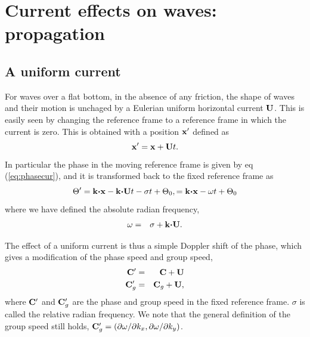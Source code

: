 \section{Current effects on waves: propagation}
\subsection{A uniform current}
For waves over a flat bottom, in the absence of any friction, the shape of waves and their 
motion is unchaged by a Eulerian uniform horizontal current $\mathbf{U}$. This is easily seen by changing 
the reference frame to a reference frame in which the current is zero. This is obtained with  a position $\mathbf{x}'$ defined as
\begin{equation}
\mathbf{x}' =\mathbf{x} + \mathbf{U} t.
\end{equation} 
In particular the phase in the moving reference frame is given by eq (\ref{eq:phasecur}), and it is transformed back to the fixed reference 
frame as 
\begin{equation}
 \Theta'={\mathbf
k}\mbox{\boldmath $\cdot$}{\mathbf x} - {\mathbf
k}\mbox{\boldmath $\cdot$} \mathbf{U} t -\sigma t+ \Theta_0,  =  {\mathbf
k}\mbox{\boldmath $\cdot$}{\mathbf x} - \omega  t+ \Theta_0\label{eq:phasecur}
\end{equation}
where we have defined the absolute radian frequency, 
\begin{eqnarray}
\omega &=& \sigma + \mathbf{k} \mbox{\boldmath $\cdot$} \mathbf{U}.
\end{eqnarray}

The effect of a uniform current is thus a simple Doppler shift of the phase, which gives a modification of the 
phase speed and group speed, 
\begin{eqnarray}
\mathbf{C}'&=&\mathbf{C} + \mathbf{U} \\
\mathbf{C}_g'&=&\mathbf{C}_g + \mathbf{U},
\end{eqnarray}
where $\mathbf{C}'$ and $\mathbf{C}_g'$ are the phase and group speed in the fixed reference frame. 
$\sigma$ is called the relative radian frequency. We note that the general definition of the 
group speed still holds, 
$\mathbf{C}_g'=(\partial \omega / \partial k_x, \partial \omega / \partial k_y)$.

